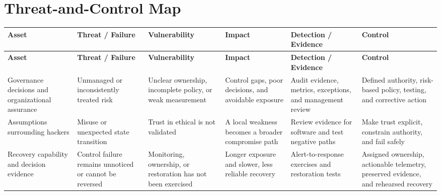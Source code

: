\documentclass[11pt]{article}
\begin{document}
\section*{Threat-and-Control Map}
\begingroup\scriptsize\setlength{\tabcolsep}{2pt}
\begin{longtable}{>{\RaggedRight\arraybackslash}p{}>{\RaggedRight\arraybackslash}p{}>{\RaggedRight\arraybackslash}p{}>{\RaggedRight\arraybackslash}p{}>{\RaggedRight\arraybackslash}p{}>{\RaggedRight\arraybackslash}p{}}
\toprule\rowcolor{Navy}\color{white}\textbf{Asset} & \color{white}\textbf{Threat / Failure} & \color{white}\textbf{Vulnerability} & \color{white}\textbf{Impact} & \color{white}\textbf{Detection / Evidence} & \color{white}\textbf{Control}\\\midrule
\endfirsthead
\toprule\rowcolor{Navy}\color{white}\textbf{Asset} & \color{white}\textbf{Threat / Failure} & \color{white}\textbf{Vulnerability} & \color{white}\textbf{Impact} & \color{white}\textbf{Detection / Evidence} & \color{white}\textbf{Control}\\\midrule
\endhead
Governance decisions and organizational assurance & Unmanaged or inconsistently treated risk & Unclear ownership, incomplete policy, or weak measurement & Control gaps, poor decisions, and avoidable exposure & Audit evidence, metrics, exceptions, and management review & Defined authority, risk-based policy, testing, and corrective action\\\midrule
Assumptions surrounding hackers & Misuse or unexpected state transition & Trust in ethical is not validated & A local weakness becomes a broader compromise path & Review evidence for software and test negative paths & Make trust explicit, constrain authority, and fail safely\\\midrule
Recovery capability and decision evidence & Control failure remains unnoticed or cannot be reversed & Monitoring, ownership, or restoration has not been exercised & Longer exposure and slower, less reliable recovery & Alert-to-response exercises and restoration tests & Assigned ownership, actionable telemetry, preserved evidence, and rehearsed recovery\\\midrule
\bottomrule
\end{longtable}
\endgroup
\end{document}

